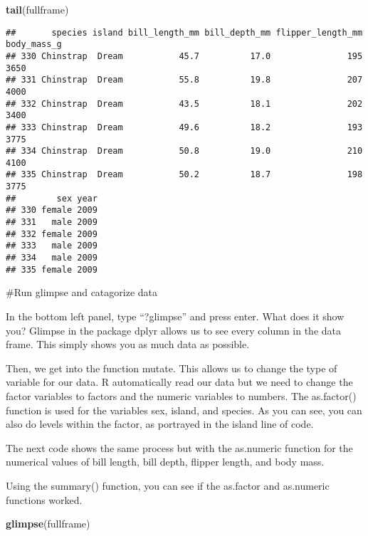 \documentclass[
]{article}
\newenvironment{Shaded}{\begin{snugshade}}{\end{snugshade}}
\newcommand{\FunctionTok}[1]{\textcolor[rgb]{0.13,0.29,0.53}{\textbf{#1}}}
\newcommand{\NormalTok}[1]{#1}
\begin{document}
\begin{Shaded}
\begin{Highlighting}[]
\FunctionTok{tail}\NormalTok{(fullframe)}
\end{Highlighting}
\end{Shaded}

\begin{verbatim}
##       species island bill_length_mm bill_depth_mm flipper_length_mm body_mass_g
## 330 Chinstrap  Dream           45.7          17.0               195        3650
## 331 Chinstrap  Dream           55.8          19.8               207        4000
## 332 Chinstrap  Dream           43.5          18.1               202        3400
## 333 Chinstrap  Dream           49.6          18.2               193        3775
## 334 Chinstrap  Dream           50.8          19.0               210        4100
## 335 Chinstrap  Dream           50.2          18.7               198        3775
##        sex year
## 330 female 2009
## 331   male 2009
## 332 female 2009
## 333   male 2009
## 334   male 2009
## 335 female 2009
\end{verbatim}

\#Run glimpse and catagorize data

In the bottom left panel, type ``?glimpse'' and press enter. What does
it show you? Glimpse in the package dplyr allows us to see every column
in the data frame. This simply shows you as much data as possible.

Then, we get into the function mutate. This allows us to change the type
of variable for our data. R automatically read our data but we need to
change the factor variables to factors and the numeric variables to
numbers. The as.factor() function is used for the variables sex, island,
and species. As you can see, you can also do levels within the factor,
as portrayed in the island line of code.

The next code shows the same process but with the as.numeric function
for the numerical values of bill length, bill depth, flipper length, and
body mass.

Using the summary() function, you can see if the as.factor and
as.numeric functions worked.

\begin{Shaded}
\begin{Highlighting}[]
\FunctionTok{glimpse}\NormalTok{(fullframe)}
\end{Highlighting}
\end{Shaded}
\end{document}

